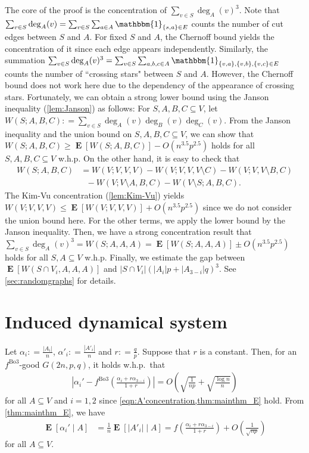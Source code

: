\documentclass[letterpaper,11pt]{article}
\newcommand{\Bthree}{\mathrm{Bo3}}
\DeclareMathOperator{\E}{\mathbf{E}}
\def\defeq{\mathrel{\mathop:}=}%
\begin{document}
The core of the proof is the concentration of $\sum_{v\in S}\deg_A(v)^3$.
Note that $\sum_{v\in S}\deg_A(v)=\sum_{v\in S}\sum_{a\in A}\mathbbm{1}_{\{s,a\}\in E}$ counts the number of cut edges between $S$ and $A$.
For fixed $S$ and $A$, the Chernoff bound yields the concentration of it since each edge appears independently.
Similarly, the summation $\sum_{v\in S}\deg_A(v)^3=\sum_{v\in S}\sum_{a,b,c\in A}\mathbbm{1}_{\{v,a\},\{v,b\},\{v,c\}\in E}$ counts the number of ``crossing stars" between $S$ and $A$.
However, the Chernoff bound does not work here due to the dependency of the appearance of crossing stars.
Fortunately, we can obtain a strong lower bound using the Janson inequality (\cref{lem:Janson}) as follows:
For $S,A,B,C\subseteq V$, let $W(S;A,B,C)\defeq \sum_{v\in S}\deg_A(v)\deg_B(v)\deg_C(v)$.
From the Janson inequality and the union bound on $S,A,B,C\subseteq V$, we can show that $W(S;A,B,C)\geq \E[W(S;A,B,C)]-O(n^{3.5}p^{2.5})$ holds for all $S,A,B,C\subseteq V$ w.h.p.
On the other hand, it is easy to check that
\begin{align*}
W(S;A,B,C) &= W(V;V,V,V) - W(V;V,V,V\setminus C) - W(V;V,V\setminus B,C) \\
 & \ \ \ - W(V;V\setminus A,B,C)-W(V\setminus S;A,B,C).
\end{align*}
The Kim-Vu concentration (\cref{lem:Kim-Vu}) yields $W(V;V,V,V)\leq \E[W(V;V,V,V)] + O(n^{3.5}p^{2.5})$ since we do not consider the union bound here.
For the other terms, we apply the lower bound by the Janson inequality.
Then, we have a strong concentration result that $\sum_{v\in S}\deg_A(v)^3 = W(S;A,A,A) =  \E[W(S;A,A,A)] \pm O(n^{3.5}p^{2.5})$ holds for all $S,A\subseteq V$ w.h.p.
Finally, we estimate the gap between $\E[W(S\cap V_i,A,A,A)]$ and $|S\cap V_i|(|A_i|p+|A_{3-i}|q)^3$. %
See \cref{sec:randomgraphs} for details.
%
\section{Induced dynamical system}\label{sec:auxiliary_results}
Let $\alpha_i \defeq \frac{|A_i|}{n}$, $\alpha'_i\defeq \frac{|A'_i|}{n}$ and $r \defeq \frac{q}{p}$.
Suppose that $r$ is a constant.
Then, for an $f^{\Bthree}$-good $G(2n,p,q)$, it holds w.h.p.~that
\begin{align}
\left|\alpha_i'-f^{\Bthree}\left(\frac{\alpha_i+r\alpha_{3-i}}{1+r}\right)\right|= O\left(\sqrt{\frac{1}{np}}+\sqrt{\frac{\log n}{n}}\right)
\label{eq:goodalphai}
\end{align}
for all $A\subseteq V$ and $i=1,2$ since \cref{eqn:A'concentration,thm:mainthm_E} hold.
From \cref{thm:mainthm_E}, we have
\begin{align}
\E[\alpha_i'\mid A]
&= \frac{1}{n}\E[|A'_i| \mid A]  = f\left(\frac{\alpha_i+r\alpha_{3-i}}{1+r}\right) + O\left(\frac{1}{\sqrt{np}}\right) \label{eqn:Ealpha}
\end{align}
for all $A\subseteq V$.
\fi
\end{document}
